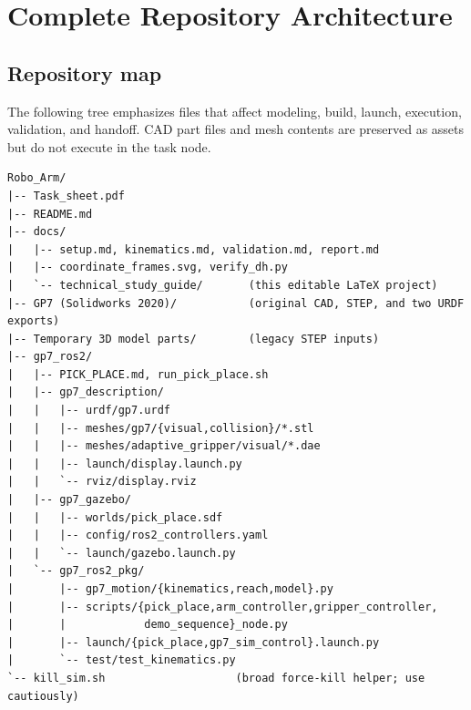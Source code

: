 \chapter{Complete Repository Architecture}
\label{ch:architecture}

\section{Repository map}
The following tree emphasizes files that affect modeling, build, launch,
execution, validation, and handoff. CAD part files and mesh contents are
preserved as assets but do not execute in the task node.

\begin{lstlisting}[caption={Significant project paths in the authoritative checkout.}]
Robo_Arm/
|-- Task_sheet.pdf
|-- README.md
|-- docs/
|   |-- setup.md, kinematics.md, validation.md, report.md
|   |-- coordinate_frames.svg, verify_dh.py
|   `-- technical_study_guide/       (this editable LaTeX project)
|-- GP7 (Solidworks 2020)/           (original CAD, STEP, and two URDF exports)
|-- Temporary 3D model parts/        (legacy STEP inputs)
|-- gp7_ros2/
|   |-- PICK_PLACE.md, run_pick_place.sh
|   |-- gp7_description/
|   |   |-- urdf/gp7.urdf
|   |   |-- meshes/gp7/{visual,collision}/*.stl
|   |   |-- meshes/adaptive_gripper/visual/*.dae
|   |   |-- launch/display.launch.py
|   |   `-- rviz/display.rviz
|   |-- gp7_gazebo/
|   |   |-- worlds/pick_place.sdf
|   |   |-- config/ros2_controllers.yaml
|   |   `-- launch/gazebo.launch.py
|   `-- gp7_ros2_pkg/
|       |-- gp7_motion/{kinematics,reach,model}.py
|       |-- scripts/{pick_place,arm_controller,gripper_controller,
|       |            demo_sequence}_node.py
|       |-- launch/{pick_place,gp7_sim_control}.launch.py
|       `-- test/test_kinematics.py
`-- kill_sim.sh                    (broad force-kill helper; use cautiously)
\end{lstlisting}

